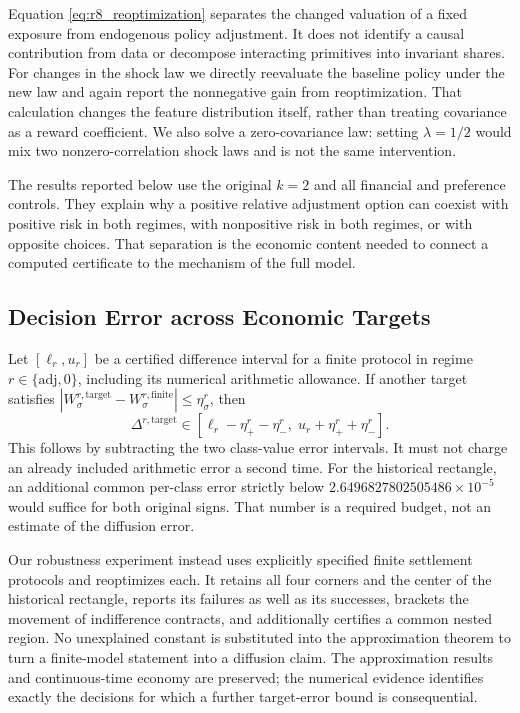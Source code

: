 Equation \eqref{eq:r8_reoptimization} separates the changed valuation of a fixed exposure from endogenous policy adjustment. It does not identify a causal contribution from data or decompose interacting primitives into invariant shares. For changes in the shock law we directly reevaluate the baseline policy under the new law and again report the nonnegative gain from reoptimization. That calculation changes the feature distribution itself, rather than treating covariance as a reward coefficient. We also solve a zero-covariance law: setting $\lambda=1/2$ would mix two nonzero-correlation shock laws and is not the same intervention.

The results reported below use the original $k=2$ and all financial and preference controls. They explain why a positive relative adjustment option can coexist with positive risk in both regimes, with nonpositive risk in both regimes, or with opposite choices. That separation is the economic content needed to connect a computed certificate to the mechanism of the full model.

\subsection{Decision Error across Economic Targets}
\label{subsec:r8_target_error}
Let $[\ell_r,u_r]$ be a certified difference interval for a finite protocol in regime $r\in\{\mathrm{adj},0\}$, including its numerical arithmetic allowance. If another target satisfies $|W_\sigma^{r,\mathrm{target}}-W_\sigma^{r,\mathrm{finite}}|\leq\eta_\sigma^r$, then
\begin{equation}
 \Delta^{r,\mathrm{target}}\in
 [\ell_r-\eta_+^r-\eta_-^r,\;u_r+\eta_+^r+\eta_-^r].
 \label{eq:r8_target_budget}
\end{equation}
This follows by subtracting the two class-value error intervals. It must not charge an already included arithmetic error a second time. For the historical rectangle, an additional common per-class error strictly below $2.6496827802505486\times10^{-5}$ would suffice for both original signs. That number is a required budget, not an estimate of the diffusion error.

Our robustness experiment instead uses explicitly specified finite settlement protocols and reoptimizes each. It retains all four corners and the center of the historical rectangle, reports its failures as well as its successes, brackets the movement of indifference contracts, and additionally certifies a common nested region. No unexplained constant is substituted into the approximation theorem to turn a finite-model statement into a diffusion claim. The approximation results and continuous-time economy are preserved; the numerical evidence identifies exactly the decisions for which a further target-error bound is consequential.
